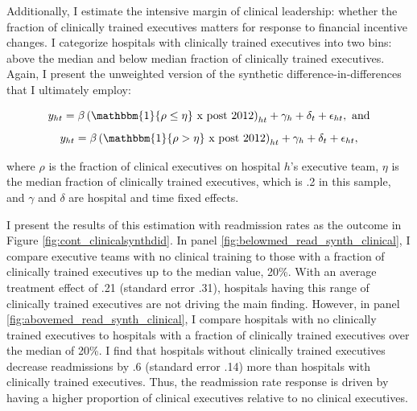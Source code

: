 \documentclass[12pt]{article}
\begin{document}
\begin{figure}[ht!]
\begin{subfigure}[b]{0.45\textwidth}
         \label{fig:mort_synth_clinical}
     \end{subfigure}
        \label{fig:clinicalsynthdid}
    \end{figure}

    Additionally, I estimate the intensive margin of clinical leadership: whether the fraction of clinically trained executives matters for response to financial incentive changes. I categorize hospitals with clinically trained executives into two bins: above the median and below median fraction of clinically trained executives. Again, I present the unweighted version of the synthetic difference-in-differences that I ultimately employ:

    \begin{equation}
    \label{eq:clinical_continuous_onefourth}
    y_{ht} = \beta \left(\mathbbm{1}\{\rho \leq \eta\}\text{ x post 2012}\right)_{ht} + \gamma_{h} + \delta_t + \epsilon_{ht}, \text{ and}
    \end{equation}
    \begin{equation}
    \label{eq:clinical_continuous_onehalf}
    y_{ht} = \beta \left(\mathbbm{1}\{\rho > \eta\}\text{ x post 2012}\right)_{ht} + \gamma_{h} + \delta_t + \epsilon_{ht},
    \end{equation}

    \noindent where $\rho$ is the fraction of clinical executives on hospital $h$'s executive team, $\eta$ is the median fraction of clinically trained executives, which is .2 in this sample, and $\gamma$ and $\delta$ are hospital and time fixed effects. 

    I present the results of this estimation with readmission rates as the outcome in Figure \ref{fig:cont_clinicalsynthdid}. In panel \ref{fig:belowmed_read_synth_clinical}, I compare executive teams with no clinical training to those with a fraction of clinically trained executives up to the median value, 20\%. With an average treatment effect of .21 (standard error .31), hospitals having this range of clinically trained executives are not driving the main finding. However, in panel \ref{fig:abovemed_read_synth_clinical}, I compare hospitals with no clinically trained executives to hospitals with a fraction of clinically trained executives over the median of 20\%. I find that hospitals without clinically trained executives decrease readmissions by .6 (standard error .14) more than hospitals with clinically trained executives. Thus, the readmission rate response is driven by having a higher proportion of clinical executives relative to no clinical executives.
\end{document}
